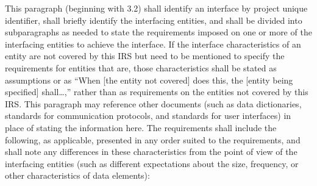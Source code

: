 \documentclass{fidata-report-template}
\begin{document}
This paragraph (beginning with 3.2) shall identify an interface by
project unique identifier, shall briefly identify the interfacing
entities, and shall be divided into subparagraphs as needed to state the
requirements imposed on one or more of the interfacing entities to
achieve the interface. If the interface characteristics of an entity are
not covered by this IRS but need to be mentioned to specify the
requirements for entities that are, those characteristics shall be
stated as assumptions or as ``When {[}the entity not covered{]} does
this, the {[}entity being specified{]} shall\ldots{},'' rather than as
requirements on the entities not covered by this IRS. This paragraph may
reference other documents (such as data dictionaries, standards for
communication protocols, and standards for user interfaces) in place of
stating the information here. The requirements shall include the
following, as applicable, presented in any order suited to the
requirements, and shall note any differences in these characteristics
from the point of view of the interfacing entities (such as different
expectations about the size, frequency, or other characteristics of data
elements):
\end{document}
